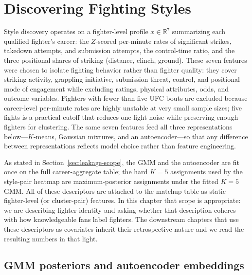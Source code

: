 \documentclass[12pt,oneside]{report}
\begin{document}
\chapter{Discovering Fighting Styles}\label{ch:style}

Style discovery operates on a fighter-level profile \(x \in \mathbb{R}^7\) summarizing each qualified fighter's career: the
$Z$-scored per-minute rates of significant strikes, takedown
attempts, and submission attempts, the control-time ratio, and the
three positional shares of striking (distance, clinch, ground).
These seven features were chosen to isolate fighting behavior rather than fighter quality: they cover striking activity, grappling initiative, submission threat, control, and positional mode of engagement while excluding ratings, physical attributes, odds, and outcome variables.
Fighters with fewer than five UFC bouts are excluded because career-level per-minute rates are highly unstable at very small sample sizes; five fights is a practical cutoff that reduces one-fight noise while preserving enough fighters for clustering.  The same seven features feed all three
representations below---$K$-means, Gaussian mixtures, and an
autoencoder---so that any difference between representations reflects
model choice rather than feature engineering.

As stated in Section~\ref{sec:leakage-scope}, the GMM and the
autoencoder are fit once on the full career-aggregate table; the
hard \(K = 5\) assignments used by the style-pair heatmap are maximum-posterior assignments under the fitted \(K = 5\) GMM.  All of these descriptors
are attached to the matchup table as static fighter-level (or
cluster-pair) features.  In this chapter that scope is
appropriate: we are describing fighter identity and asking whether
that description coheres with how knowledgeable fans label
fighters.  The downstream chapters that use these descriptors as
covariates inherit their retrospective nature and we read the
resulting numbers in that light.

\section{GMM posteriors and autoencoder embeddings}
\end{document}

